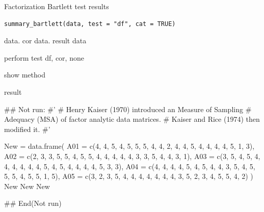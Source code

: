 \documentclass[a4paper]{book}
\begin{document}
%
\begin{Description}
Factorization Bartlett test results
\end{Description}
%
\begin{Usage}
\begin{verbatim}
summary_bartlett(data, test = "df", cat = TRUE)
\end{verbatim}
\end{Usage}
%
\begin{Arguments}
\begin{ldescription}
\item[\code{data}] data. cor data. result data

\item[\code{test}] perform test df, cor, none

\item[\code{cat}] show method
\end{ldescription}
\end{Arguments}
%
\begin{Value}
result
\end{Value}
%
\begin{Examples}
\begin{ExampleCode}

\#\# Not run: 
#'
# Henry Kaiser (1970) introduced an Measure of Sampling
# Adequacy  (MSA) of factor analytic data matrices.
# Kaiser and Rice (1974) then modified it.
#'

New = data.frame(
  A01 = c(4, 4, 5, 4, 5, 5, 5, 4, 4, 2, 4, 4, 5, 4, 4, 4, 4, 5, 1, 3),
  A02 = c(2, 3, 3, 5, 5, 4, 5, 5, 4, 4, 4, 4, 4, 3, 3, 5, 4, 4, 3, 1),
  A03 = c(3, 5, 4, 5, 4, 4, 4, 4, 4, 4, 5, 4, 5, 4, 4, 4, 4, 5, 3, 3),
  A04 = c(4, 4, 4, 4, 5, 4, 5, 4, 4, 3, 5, 4, 5, 5, 5, 4, 5, 5, 1, 5),
  A05 = c(3, 2, 3, 5, 4, 4, 4, 4, 4, 4, 4, 3, 5, 2, 3, 4, 5, 5, 4, 2)
)
New %
New %
New %


## End(Not run)
\end{ExampleCode}
\end{Examples}
\end{document}
